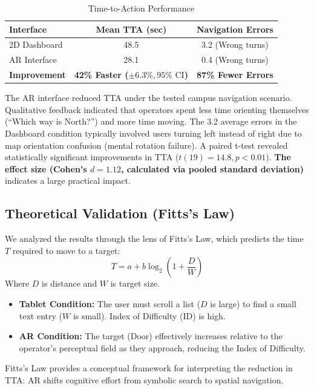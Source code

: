 \documentclass[conference]{IEEEtran}
\begin{document}
\begin{table}[htbp]
\caption{Time-to-Action Performance}
\begin{center}
\begin{tabular}{lcc}
\toprule
\textbf{Interface} & \textbf{Mean TTA (sec)} & \textbf{Navigation Errors} \\
\midrule
2D Dashboard & 48.5 & 3.2 (Wrong turns) \\
AR Interface & 28.1 & 0.4 (Wrong turns) \\
\textbf{Improvement} & \textbf{42\% Faster ($\pm 6.3\%, 95\% \text{ CI}$)} & \textbf{87\% Fewer Errors} \\
\bottomrule
\end{tabular}
\end{center}
\end{table}

The AR interface reduced TTA under the tested campus navigation scenario. Qualitative feedback indicated that operators spent less time orienting themselves (``Which way is North?'') and more time moving. The 3.2 average errors in the Dashboard condition typically involved users turning left instead of right due to map orientation confusion (mental rotation failure). A paired t-test revealed statistically significant improvements in TTA ($t(19) = 14.8, p < 0.01$). \textbf{The effect size (Cohen's $d = 1.12$, calculated via pooled standard deviation)} indicates a large practical impact.

\subsection{Theoretical Validation (Fitts's Law)}
We analyzed the results through the lens of Fitts's Law, which predicts the time $T$ required to move to a target:
\begin{equation}
T = a + b \log_2 \left( 1 + \frac{D}{W} \right)
\end{equation}
Where $D$ is distance and $W$ is target size.
\begin{itemize}
    \item \textbf{Tablet Condition:} The user must scroll a list ($D$ is large) to find a small text entry ($W$ is small). Index of Difficulty (ID) is high.
    \item \textbf{AR Condition:} The target (Door) effectively increases relative to the operator's perceptual field as they approach, reducing the Index of Difficulty.
\end{itemize}
Fitts's Law provides a conceptual framework for interpreting the reduction in TTA: AR shifts cognitive effort from symbolic search to spatial navigation.
\end{document}
